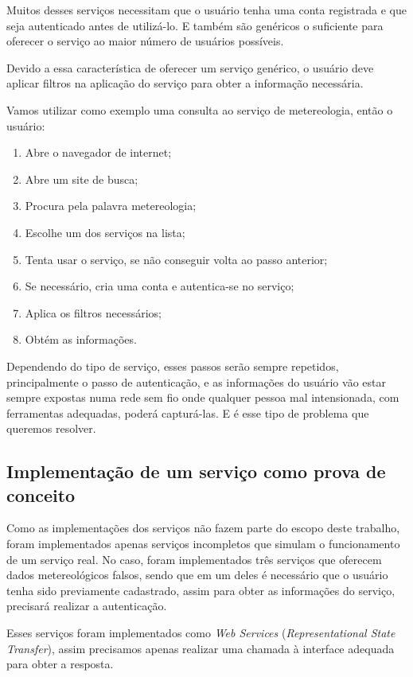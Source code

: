 Muitos desses serviços necessitam que o usuário tenha uma conta registrada e que seja autenticado antes de utilizá-lo. E também são genéricos o suficiente para oferecer o serviço ao maior número de usuários possíveis.

Devido a essa característica de oferecer um serviço genérico, o usuário deve aplicar filtros na aplicação do serviço para obter a informação necessária.

Vamos utilizar como exemplo uma consulta ao serviço de metereologia, então o usuário:
\begin{enumerate}
  \item Abre o navegador de internet;
  \item Abre um site de busca;
  \item Procura pela palavra metereologia;
  \item Escolhe um dos serviços na lista;
  \item Tenta usar o serviço, se não conseguir volta ao passo anterior;
  \item Se necessário, cria uma conta e autentica-se no serviço;
  \item Aplica os filtros necessários;
  \item Obtém as informações.
\end{enumerate}

Dependendo do tipo de serviço, esses passos serão sempre repetidos, principalmente o passo de autenticação, e as informações do usuário vão estar sempre expostas numa rede sem fio onde qualquer pessoa mal intensionada, com ferramentas adequadas, poderá capturá-las. E é esse tipo de problema que queremos resolver.

\subsection{Implementação de um serviço como prova de conceito}
Como as implementações dos serviços não fazem parte do escopo deste trabalho, foram implementados apenas serviços incompletos que simulam o funcionamento de um serviço real. No caso, foram implementados três serviços que oferecem dados metereológicos falsos, sendo que em um deles é necessário que o usuário tenha sido previamente cadastrado, assim para obter as informações do serviço, precisará realizar a autenticação.

Esses serviços foram implementados como \textit{Web Services}  (\textit{Representational State Transfer}), assim precisamos apenas realizar uma chamada à interface adequada para obter a resposta.


